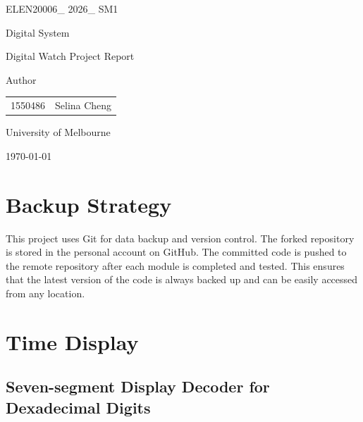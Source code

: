 \documentclass[12pt]{article}
\begin{document}
\begin{titlepage}
	\centering

	\vspace*{5cm}

	{\Large ELEN20006\_ 2026\_ SM1 \par}
	{\Huge Digital System \par}
	{\Huge Digital Watch Project Report \par}
	\vspace{2cm}

	{\large Author \par}
	\large{\begin{tabular}{c l}
			1550486 & Selina Cheng \\
		\end{tabular}}



	{\large University of Melbourne \par}
	{\large \today \par}

\end{titlepage}

\tableofcontents
\setcounter{tocdepth}{2}
\newpage



\section{Backup Strategy}
This project uses Git for data backup and version control. The forked repository is stored in the personal account on GitHub.
The committed code is pushed to the remote repository after each module is completed and tested. This ensures that the latest version of the code is always backed up and can be easily accessed from any location.


\section{Time Display}

\subsection{Seven-segment Display Decoder for Dexadecimal Digits} %
\end{document}
